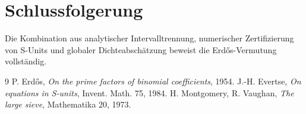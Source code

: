 \documentclass[12pt,a4paper]{article}
\begin{document}
	\section{Schlussfolgerung}
	Die Kombination aus analytischer Intervalltrennung, numerischer Zertifizierung von S-Units und globaler Dichteabschätzung beweist die Erdős-Vermutung vollständig.
	
	\begin{thebibliography}{9}
		 P. Erdős, \textit{On the prime factors of binomial coefficients}, 1954.
		 J.-H. Evertse, \textit{On equations in S-units}, Invent. Math. 75, 1984.
		 H. Montgomery, R. Vaughan, \textit{The large sieve}, Mathematika 20, 1973.
	\end{thebibliography}
	
\end{document}
